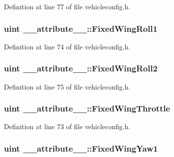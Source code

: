 Definition at line 77 of file vehicleconfig.\-h.

\hypertarget{group___config_plugin_ga674f11a566247fc5041091e940c5d679}{
\subsubsection[{Fixed\-Wing\-Roll1}]{\setlength{\rightskip}{0pt plus 5cm}uint \-\_\-\-\_\-attribute\-\_\-\-\_\-\-::\-Fixed\-Wing\-Roll1}}\label{group___config_plugin_ga674f11a566247fc5041091e940c5d679}


Definition at line 74 of file vehicleconfig.\-h.

\hypertarget{group___config_plugin_ga1d932ff664060c5dd74bb8ec48b4d8ff}{
\subsubsection[{Fixed\-Wing\-Roll2}]{\setlength{\rightskip}{0pt plus 5cm}uint \-\_\-\-\_\-attribute\-\_\-\-\_\-\-::\-Fixed\-Wing\-Roll2}}\label{group___config_plugin_ga1d932ff664060c5dd74bb8ec48b4d8ff}


Definition at line 75 of file vehicleconfig.\-h.

\hypertarget{group___config_plugin_ga2c5e7e1c1622df1735c63b2a700b1f30}{
\subsubsection[{Fixed\-Wing\-Throttle}]{\setlength{\rightskip}{0pt plus 5cm}uint \-\_\-\-\_\-attribute\-\_\-\-\_\-\-::\-Fixed\-Wing\-Throttle}}\label{group___config_plugin_ga2c5e7e1c1622df1735c63b2a700b1f30}


Definition at line 73 of file vehicleconfig.\-h.

\hypertarget{group___config_plugin_ga8282dac2550d491034ca0e0fa8f09c0d}{
\subsubsection[{Fixed\-Wing\-Yaw1}]{\setlength{\rightskip}{0pt plus 5cm}uint \-\_\-\-\_\-attribute\-\_\-\-\_\-\-::\-Fixed\-Wing\-Yaw1}}\label{group___config_plugin_ga8282dac2550d491034ca0e0fa8f09c0d}


